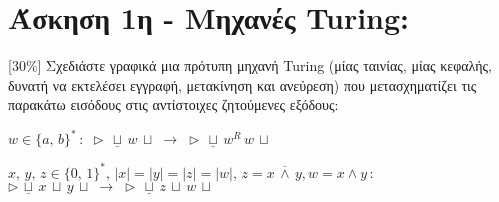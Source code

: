 \section{Άσκηση 1η - Μηχανές Turing:}
\label{sec:Exercise_1}
\doublespacing

[30\%] Σχεδιάστε γραφικά μια πρότυπη μηχανή Turing (μίας ταινίας, μίας κεφαλής, δυνατή να εκτελέσει εγγραφή,
μετακίνηση και ανεύρεση) που μετασχηματίζει τις παρακάτω εισόδους στις αντίστοιχες ζητούμενες εξόδους:

\bm{\textcolor{blue}{(α)}} $w \in \{a,\,b\}^*\,:\; \triangleright\, \underline{\sqcup}\, w\, \sqcup \;\rightarrow\;
							\triangleright\, \underline{\sqcup}\, w^R \,w\, \sqcup$

\bm{\textcolor{blue}{(β)}} $x,\,y,\,z \in \{0,\,1\}^*,\,|x|=|y|=|z|=|w|,\, z = x\, \overline{\land}\, y, w = x\land
y\,:\;$\\
\hspace*{1.35cm} $\triangleright\, \underline{\sqcup}\,x\, \sqcup\, y\, \sqcup \;\rightarrow\; \triangleright\,
\underline{\sqcup}\, z\, \sqcup\, w\, \sqcup $

\clearpage
